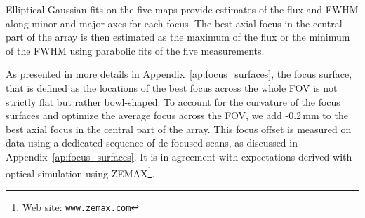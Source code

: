 

Elliptical Gaussian fits on the five maps provide estimates of
the flux and FWHM along minor and major axes for each focus. 
The best axial focus in the central part of the array is then
estimated as the maximum of the flux or the minimum of the FWHM using
parabolic fits of the five measurements.

As presented in more details in Appendix~\ref{ap:focus_surfaces}, the focus
surface, that is defined as the locations of the best focus across the whole FOV
is not strictly flat but rather bowl-shaped.
To account for the curvature of the focus surfaces and optimize the
average focus across the FOV, we add -0.2\,mm to the best axial focus
in the central part of the array. This focus offset is measured on data using
a dedicated sequence of de-focused scans, as discussed in
Appendix~\ref{ap:focus_surfaces}. It is in agreement with expectations
derived with optical simulation using ZEMAX\footnote{Web site: \tt{www.zemax.com}}. 

